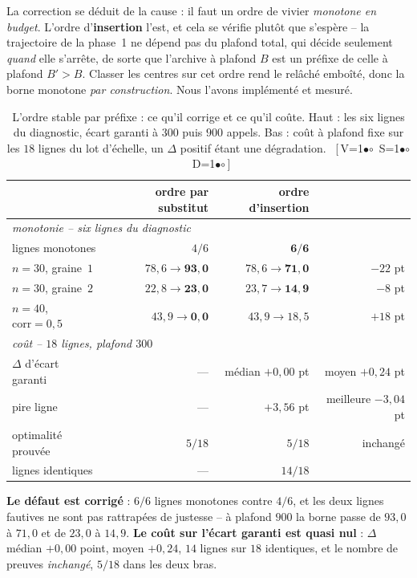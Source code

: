 \documentclass[11pt,a4paper]{article}
\theoremstyle{plain}
\theoremstyle{remark}
\newcommand{\cfgm}[1]{\ifnum#1=1$\bullet$\else$\circ$\fi}
\newcommand{\conf}[3]{%
  \textsf{\footnotesize[\,V\cfgm{#1}\ S\cfgm{#2}\ D\cfgm{#3}\,]}}
\begin{document}
\noindent
La correction se déduit de la cause : il faut un ordre de vivier
\emph{monotone en budget}. L'ordre d'\textbf{insertion} l'est, et cela se
vérifie plutôt que s'espère -- la trajectoire de la phase~1 ne dépend pas du
plafond total, qui décide seulement \emph{quand} elle s'arrête, de sorte que
l'archive à plafond $B$ est un préfixe de celle à plafond $B'>B$. Classer
les centres sur cet ordre rend le relâché emboîté, donc la borne monotone
\emph{par construction}. Nous l'avons implémenté et mesuré.

\begin{table}[H]
\centering
\caption{L'ordre stable par préfixe : ce qu'il corrige et ce qu'il coûte.
Haut : les six lignes du diagnostic, écart garanti à $300$ puis $900$
appels. Bas : coût à plafond fixe sur les $18$ lignes du lot d'échelle, un
$\Delta$ positif étant une dégradation.\ \conf{1}{1}{1}}
\label{tab:vivierstable}
\begin{tabular}{lrrr}
\toprule
 & ordre par substitut & ordre d'insertion &\\
\midrule
\multicolumn{4}{l}{\emph{monotonie -- six lignes du diagnostic}}\\
lignes monotones & $4/6$ & $\mathbf{6/6}$ &\\
$n=30$, graine~$1$ & $78{,}6\to\mathbf{93{,}0}$ & $78{,}6\to\mathbf{71{,}0}$
 & $-22$ pt\\
$n=30$, graine~$2$ & $22{,}8\to\mathbf{23{,}0}$ & $23{,}7\to\mathbf{14{,}9}$
 & $-8$ pt\\
$n=40$, $\text{corr}=0{,}5$ & $43{,}9\to\mathbf{0{,}0}$
 & $43{,}9\to 18{,}5$ & $+18$ pt\\
\midrule
\multicolumn{4}{l}{\emph{coût -- $18$ lignes, plafond $300$}}\\
$\Delta$ d'écart garanti & --- & médian $+0{,}00$ pt & moyen $+0{,}24$ pt\\
pire ligne & --- & $+3{,}56$ pt & meilleure $-3{,}04$ pt\\
optimalité prouvée & $5/18$ & $5/18$ & inchangé\\
lignes identiques & --- & $14/18$ &\\
\bottomrule
\end{tabular}
\end{table}

\noindent
\textbf{Le défaut est corrigé} : $6/6$ lignes monotones contre $4/6$, et les
deux lignes fautives ne sont pas rattrapées de justesse -- à plafond $900$
la borne passe de $93{,}0$ à $71{,}0$ et de $23{,}0$ à $14{,}9$. \textbf{Le
coût sur l'écart garanti est quasi nul} : $\Delta$ médian $+0{,}00$ point,
moyen $+0{,}24$, $14$ lignes sur $18$ identiques, et le nombre de preuves
\emph{inchangé}, $5/18$ dans les deux bras.
\end{document}
